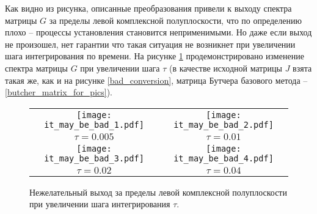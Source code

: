 \documentclass[a4paper, 14pt]{extreport} %
\begin{document}
Как видно из рисунка, описанные преобразования привели к выходу
спектра  матрицы $G$ за пределы левой комплексной полуплоскости, что
по определению плохо -- процессы установления становится
неприменимыми. Но даже если выход не произошел, нет гарантии что
такая ситуация не возникнет при увеличении шага интегрирования по
времени. На рисунке \ref{it_may_be_bad} продемонстрировано изменение
спектра матрицы $G$ при увеличении шага $\tau$ (в качестве исходной
матрицы $J$ взята такая же, как и на рисунке \ref{bad_conversion},
матрица Бутчера базового метода -- \eqref{butcher_matrix_for_pics}).
\begin{figure}
\begin{center}
\begin{tabular}{cc}

 \texttt{[image: it\_may\_be\_bad\_1.pdf]}& \texttt{[image: it\_may\_be\_bad\_2.pdf]}\\
\footnotesize{$\tau=0.005$}& \footnotesize{$\tau = 0.01$}\\

 \texttt{[image: it\_may\_be\_bad\_3.pdf]}& \texttt{[image: it\_may\_be\_bad\_4.pdf]}\\
\footnotesize{$\tau=0.02$}& \footnotesize{$\tau = 0.04$}
\end{tabular}
\end{center}
\caption{\small Нежелательный выход за пределы левой комплексной полуплоскости при увеличении шага интегрирования $\tau$.}
\label{it_may_be_bad}
\end{figure}
\end{document}
